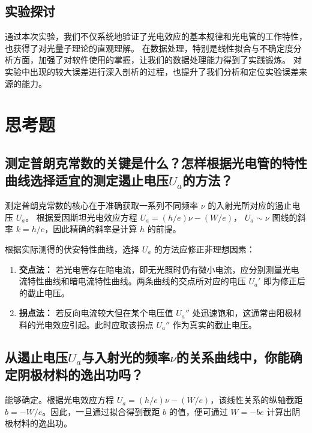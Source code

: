 \documentclass{../../templates/Report}%
\begin{document}
\begin{fullreportonly}
\subsection{实验探讨}
通过本次实验，我们不仅系统地验证了光电效应的基本规律和光电管的工作特性，也获得了对光量子理论的直观理解。
在数据处理，特别是线性拟合与不确定度分析方面，加强了对软件使用的掌握，让我们的数据处理能力得到了实践锻炼。
对实验中出现的较大误差进行深入剖析的过程，也提升了我们分析和定位实验误差来源的能力。

\section{思考题}
\subsection{测定普朗克常数的关键是什么？怎样根据光电管的特性曲线选择适宜的测定遏止电压$U_a$的方法？}

测定普朗克常数的核心在于准确获取一系列不同频率 $\nu$ 的入射光所对应的遏止电压 $U_a$。
根据爱因斯坦光电效应方程 $U_a = (h/e)\nu - (W/e)$， $U_a \sim \nu$ 图线的斜率 $k = h/e$，因此精确的斜率是计算 $h$ 的前提。

根据实际测得的伏安特性曲线，选择 $U_a$ 的方法应修正非理想因素：
\begin{enumerate}
    \item \textbf{交点法：} 若光电管存在暗电流，即无光照时仍有微小电流，应分别测量光电流特性曲线和暗电流特性曲线。两条曲线的交点所对应的电压 $U_a'$ 即为修正后的截止电压。
    \item \textbf{拐点法：} 若反向电流较大但在某个电压值 $U_a''$ 处迅速饱和，这通常由阳极材料的光电效应引起。此时应取该拐点 $U_a''$ 作为真实的截止电压。
\end{enumerate}

\subsection{从遏止电压$U_a$与入射光的频率$\nu$的关系曲线中，你能确定阴极材料的逸出功吗？}
能够确定。根据光电效应方程 $U_a = (h/e)\nu - (W/e)$，该线性关系的纵轴截距$b = -W/e$。因此，一旦通过拟合得到截距 $b$ 的值，便可通过 $W = -be$ 计算出阴极材料的逸出功。


\end{fullreportonly}
\end{document}

